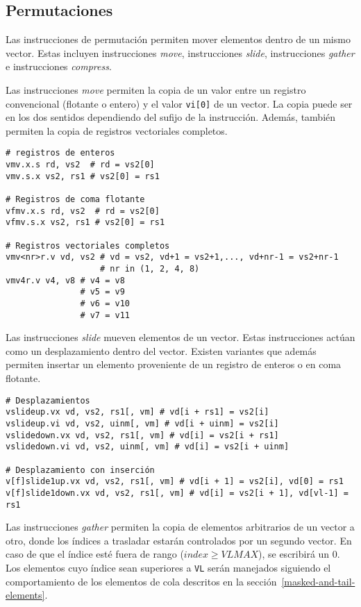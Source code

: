 \subsection{Permutaciones}
Las instrucciones de permutación permiten mover elementos dentro de un mismo
vector. Estas incluyen instrucciones \textit{move}, instrucciones
\textit{slide}, instrucciones \textit{gather} e instrucciones
\textit{compress}.

Las instrucciones \textit{move} permiten la copia de un valor entre un registro
convencional (flotante o entero) y el valor \texttt{vi[0]} de un vector. La
copia puede ser en los dos sentidos dependiendo del sufijo de la instrucción.
Además, también permiten la copia de registros vectoriales completos.

\begin{lstlisting}
# registros de enteros
vmv.x.s rd, vs2  # rd = vs2[0]
vmv.s.x vs2, rs1 # vs2[0] = rs1

# Registros de coma flotante
vfmv.x.s rd, vs2  # rd = vs2[0]
vfmv.s.x vs2, rs1 # vs2[0] = rs1

# Registros vectoriales completos
vmv<nr>r.v vd, vs2 # vd = vs2, vd+1 = vs2+1,..., vd+nr-1 = vs2+nr-1
                   # nr in (1, 2, 4, 8)
vmv4r.v v4, v8 # v4 = v8 
               # v5 = v9
               # v6 = v10
               # v7 = v11
\end{lstlisting}

Las instrucciones \textit{slide} mueven elementos de un vector. Estas instrucciones
actúan como un desplazamiento dentro del vector. Existen variantes que además
permiten insertar un elemento proveniente de un registro de enteros o en coma
flotante.

\begin{lstlisting}
# Desplazamientos
vslideup.vx vd, vs2, rs1[, vm] # vd[i + rs1] = vs2[i]
vslideup.vi vd, vs2, uinm[, vm] # vd[i + uinm] = vs2[i]
vslidedown.vx vd, vs2, rs1[, vm] # vd[i] = vs2[i + rs1]
vslidedown.vi vd, vs2, uinm[, vm] # vd[i] = vs2[i + uinm]

# Desplazamiento con inserción
v[f]slide1up.vx vd, vs2, rs1[, vm] # vd[i + 1] = vs2[i], vd[0] = rs1
v[f]slide1down.vx vd, vs2, rs1[, vm] # vd[i] = vs2[i + 1], vd[vl-1] = rs1
\end{lstlisting}

Las instrucciones \textit{gather} permiten la copia de elementos arbitrarios de
un vector a otro, donde los índices a trasladar estarán controlados por un
segundo vector. En caso de que el índice esté fuera de rango ($index \ge
VLMAX$), se escribirá un 0. Los elementos cuyo índice sean superiores a
\texttt{VL} serán manejados siguiendo el comportamiento de los elementos de
cola descritos en la sección~\ref{masked-and-tail-elements}.

